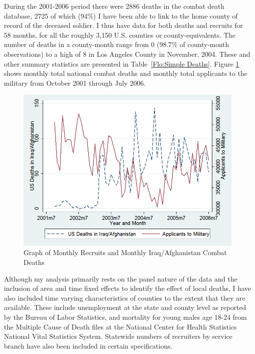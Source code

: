 \documentclass[12pt] {article}
\begin{document}
During the 2001-2006 period there were 2886 deaths in the combat death database, 2725 of which (94\%) I have been able to link to the home county of record of the deceased soldier. I thus have data for both deaths and recruits for 58 months, for all the roughly 3,150 U.S. counties or county-equivalents. The number of deaths in a county-month range from 0 (98.7\% of county-month observations) to a high of 8 in Los Angeles County in November, 2004. These and other summary statistics are presented in Table~\ref{Flo:Simple Deaths}. Figure \ref{Flo:Monthly Deaths vs. Monthly Recruits} shows monthly total national combat deaths and monthly total applicants to the military from October 2001 through July 2006. 

\begin{figure}
\includegraphics[scale=0.6]{../Output/graph_deathsvsrecruits_basic}
\caption{Graph of Monthly Recruits and Monthly Iraq/Afghanistan Combat Deaths}
\label{Flo:Monthly Deaths vs. Monthly Recruits}
\end{figure} 
 
 



Although my analysis primarily rests on the panel nature of the data
and the inclusion of area and time fixed effects to identify the effect
of local deaths, I have also included time varying characteristics
of counties to the extent that they are available. These include unemployment
at the state and county level as reported by the Bureau
of Labor Statistics, and mortality for young males age 18-24 from
the Multiple Cause of Death files at the National Center for Health
Statistics National Vital Statistics System. Statewide numbers of recruiters
by service branch have also been included in certain specifications. 
\end{document}
